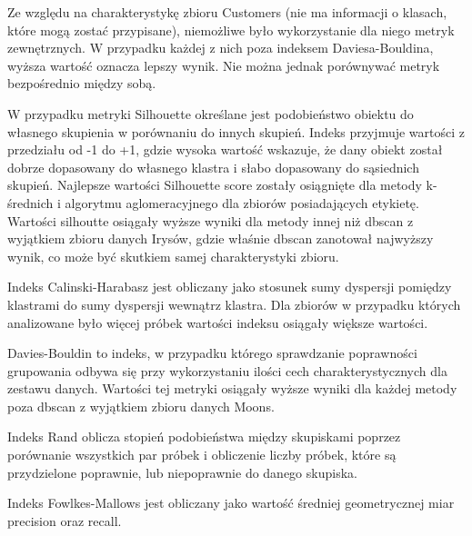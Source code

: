 \documentclass{classrep}
\begin{document}
{{            Ze względu na charakterystykę zbioru Customers (nie ma informacji o klasach, które mogą zostać przypisane), niemożliwe było wykorzystanie dla niego metryk zewnętrznych. W przypadku każdej z nich poza indeksem Daviesa-Bouldina, wyższa wartość oznacza lepszy wynik. Nie można jednak porównywać metryk bezpośrednio między sobą.
            
            W przypadku metryki Silhouette określane jest podobieństwo obiektu do własnego skupienia w porównaniu do innych skupień. Indeks przyjmuje wartości z przedziału od -1 do +1, gdzie wysoka wartość wskazuje, że dany obiekt został dobrze dopasowany do własnego klastra i słabo dopasowany do sąsiednich skupień. Najlepsze wartości Silhouette score zostały osiągnięte dla metody k-średnich i algorytmu aglomeracyjnego dla zbiorów posiadających etykietę. Wartości silhoutte osiągały wyższe wyniki dla metody innej niż dbscan z wyjątkiem zbioru danych Irysów, gdzie właśnie dbscan zanotował najwyższy wynik, co może być skutkiem samej charakterystyki zbioru.
            
            Indeks Calinski-Harabasz jest obliczany jako stosunek sumy dyspersji pomiędzy klastrami do sumy dyspersji wewnątrz klastra. Dla zbiorów w przypadku których analizowane było więcej próbek wartości indeksu osiągały większe wartości.
            
            Davies-Bouldin to indeks, w przypadku którego sprawdzanie poprawności grupowania odbywa się przy wykorzystaniu ilości cech charakterystycznych dla zestawu danych. Wartości tej metryki osiągały wyższe wyniki dla każdej metody poza dbscan z wyjątkiem zbioru danych Moons.
            
            Indeks Rand oblicza stopień podobieństwa między skupiskami poprzez porównanie wszystkich par próbek i obliczenie liczby próbek, które są przydzielone poprawnie, lub niepoprawnie do danego skupiska.
            
            Indeks Fowlkes-Mallows jest obliczany jako wartość średniej geometrycznej miar precision oraz recall.
        }

    }
\end{document}
